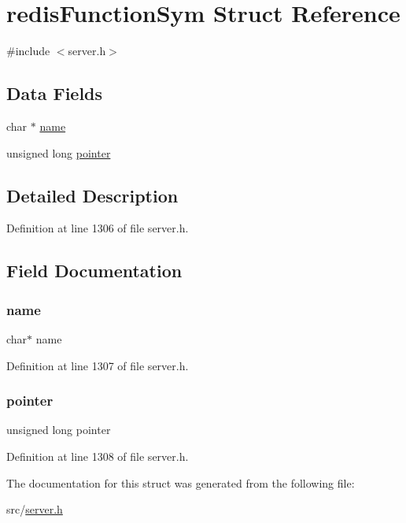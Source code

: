 \hypertarget{structredis_function_sym}{}\section{redis\+Function\+Sym Struct Reference}
\label{structredis_function_sym}


{\ttfamily \#include $<$server.\+h$>$}

\subsection*{Data Fields}
\begin{DoxyCompactItemize}
\item 
char $\ast$ \hyperlink{structredis_function_sym_a5ac083a645d964373f022d03df4849c8}{name}
\item 
unsigned long \hyperlink{structredis_function_sym_a4037fd214cf4412f72001bc7ef15c2e2}{pointer}
\end{DoxyCompactItemize}


\subsection{Detailed Description}


Definition at line 1306 of file server.\+h.



\subsection{Field Documentation}
\mbox{\label{structredis_function_sym_a5ac083a645d964373f022d03df4849c8}} 
\subsubsection{\texorpdfstring{name}{name}}
{\footnotesize\ttfamily char$\ast$ name}



Definition at line 1307 of file server.\+h.

\mbox{\label{structredis_function_sym_a4037fd214cf4412f72001bc7ef15c2e2}} 
\subsubsection{\texorpdfstring{pointer}{pointer}}
{\footnotesize\ttfamily unsigned long pointer}



Definition at line 1308 of file server.\+h.



The documentation for this struct was generated from the following file\+:\begin{DoxyCompactItemize}
\item 
src/\hyperlink{server_8h}{server.\+h}\end{DoxyCompactItemize}
